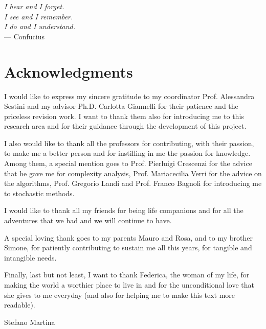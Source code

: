 
\begin{flushright}{
    \slshape
    I hear and I forget.\\
    I see and I remember.\\
    I do and I understand.} \\ \medskip
    --- Confucius
\end{flushright}

\bigskip

\begingroup
\let\clearpage\relax
\let\cleardoublepage\relax
\let\cleardoublepage\relax
\chapter*{Acknowledgments}
I would like to express my sincere gratitude to my coordinator
Prof. Alessandra Sestini and my advisor 
Ph.D. Carlotta Giannelli for their patience and the priceless revision
work. I want to thank them also for introducing me to this research
area and for their guidance through the development of this project.

I also would like to thank all the professors for contributing, with
their passion, to make me a better person and for instilling in me the
passion for knowledge. Among them, a special mention goes to
Prof. Pierluigi Crescenzi for the advice that he gave me for
complexity analysis, Prof. Mariacecilia Verri for the advice on the
algorithms, Prof. Gregorio Landi and Prof. Franco Bagnoli for
introducing me to stochastic methods.

I would like to thank all my friends for being life companions and for
all the adventures that we had and we will continue to have.

A special loving thank goes to my parents Mauro and Rosa, and to my
brother Simone, for patiently 
contributing to sustain me all this years, for tangible and
intangible needs.

Finally, last but not least, I want to thank
Federica, the woman of my life, for making the world a worthier place
to live in 
and for the 
unconditional love that she gives to me everyday (and also for
helping me to make this text more readable).

\begin{flushright}{\calligra
Stefano Martina}
\end{flushright}
\endgroup




